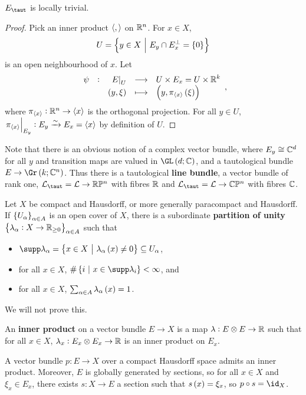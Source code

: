 \begin{lemma}
$ E_{\taut} $ is locally trivial.
\end{lemma}

\begin{proof}
Pick an inner product $ \left\langle , \right\rangle $ on $ \mathbb{R}^n $. For $ x \in X $,
$$ U = \cbr{y \in X \st E_y \cap E_x^\perp = \cbr{0}} $$
is an open neighbourhood of $ x $. Let
$$ \function[\psi]{\eval{E}_U}{U \times E_x = U \times \RR^k}{\br{y, \xi}}{\br{y, \pi_{\abr{x}}\br{\xi}}}, $$
where $ \pi_{\left\langle x \right\rangle} : \mathbb{R}^n \to \left\langle x \right\rangle $ is the orthogonal projection. For all $ y \in U $, $ \left. \pi_{\left\langle x \right\rangle} \right|_{E_y} : E_y \xrightarrow{\sim} E_x = \left\langle x \right\rangle $ by definition of $ U $.
\end{proof}

Note that there is an obvious notion of a complex vector bundle, where $ E_y \cong \mathbb{C}^d $ for all $ y $ and transition maps are valued in $ \GL\br{d; \CC} $, and a tautological bundle $ E \to \Gr\br{k; \CC^n} $. Thus there is a tautological \textbf{line bundle}, a vector bundle of rank one, $ \LLL_{\taut} = \LLL \to \RR\PP^n $ with fibres $ \mathbb{R} $ and $ \LLL_{\taut} = \LLL \to \CC\PP^n $ with fibres $ \mathbb{C} $.

\begin{lemma}
Let $ X $ be compact and Hausdorff, or more generally paracompact and Hausdorff. If $ \cbr{U_\alpha}_{\alpha \in A} $ is an open cover of $ X $, there is a subordinate \textbf{partition of unity} $ \cbr{\lambda_\alpha : X \to \RR_{\ge 0}}_{\alpha \in A} $ such that
\begin{itemize}
\item $ \supp \lambda_\alpha = \cbr{x \in X \st \lambda_\alpha\br{x} \ne 0} \subseteq U_\alpha $,
\item for all $ x \in X $, $ \#\cbr{i \st x \in \supp \lambda_i} < \infty $, and
\item for all $ x \in X $, $ \sum_{\alpha \in A} \lambda_\alpha\br{x} = 1 $.
\end{itemize}
\end{lemma}

We will not prove this.

\begin{definition*}
An \textbf{inner product} on a vector bundle $ E \to X $ is a map $ \lambda : E \otimes E \to \mathbb{R} $ such that for all $ x \in X $, $ \lambda_x : E_x \otimes E_x \to \mathbb{R} $ is an inner product on $ E_x $.
\end{definition*}

\begin{lemma}
A vector bundle $ p : E \to X $ over a compact Hausdorff space admits an inner product. Moreover, $ E $ is globally generated by sections, so for all $ x \in X $ and $ \xi_x \in E_x $, there exists $ s : X \to E $ a section such that $ s\br{x} = \xi_x $, so $ p \circ s = \id_X $.
\end{lemma}

